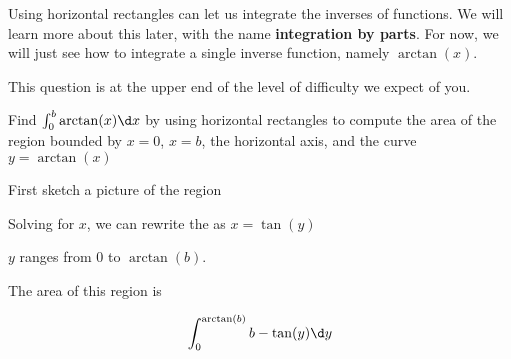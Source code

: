 \documentclass{ximera}
\author{Steven Gubkin}
\begin{document}
\begin{exercise}



Using horizontal rectangles can let us integrate the inverses of functions.  We will learn more about this later, with the name \textbf{integration by parts}.  For now, we will just see how to integrate a single inverse function, namely $\arctan(x)$.

\begin{warning}
	This question is at the upper end of the level of difficulty we expect of you.
\end{warning}

Find $\int_0^b \arctan(x) \d x$ by using horizontal rectangles to compute the area of the region bounded by $x=0$, $x=b$, the horizontal axis, and the curve $y=\arctan(x)$

\begin{hint}

	First sketch a picture of the region

\begin{image}
\end{image}
\end{hint}

\begin{hint}

Solving for $x$, we can rewrite the  as $x = \tan(y)$

$y$ ranges from $0$ to $\arctan(b)$.
\end{hint}

\begin{hint}
	The area of this region is

	\[
	\int_{0}^{\arctan(b)} b - \tan(y) \d y
	\]
\end{hint}


\end{exercise}
\end{document}
